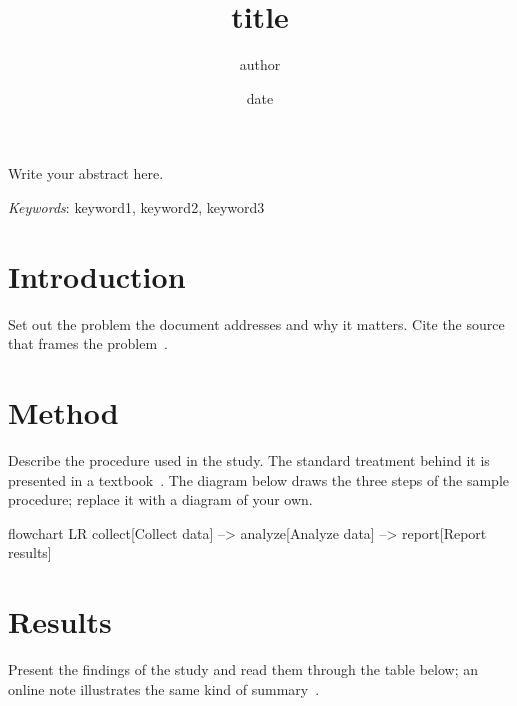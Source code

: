 \documentclass[a4paper,12pt]{report}
\title{{{title}}}
\author{{{author}}}
\date{{{date}}}
\newcommand{\lblKeywords}{Keywords}
\numberwithin{equation}{chapter}
\begin{document}
  \maketitle
  \thispagestyle{empty}\newpage

  \chapter*{\abstractname}
  Write your abstract here.

  \noindent\textit{\lblKeywords}: keyword1, keyword2, keyword3

  \chapter{Introduction}
  Set out the problem the document addresses and why it matters. Cite the
  source that frames the problem~\cite{example}.

  \chapter{Method}
  Describe the procedure used in the study. The standard treatment behind it
  is presented in a textbook~\cite{example2}. The diagram below draws the
  three steps of the sample procedure; replace it with a diagram of your own.

  \begin{mermaid}[style=monochrome, caption={General flow of the procedure}, pos=H]
    flowchart LR
    collect[Collect data] --> analyze[Analyze data] --> report[Report results]
  \end{mermaid}

  \chapter{Results}
  Present the findings of the study and read them through the table below; an
  online note illustrates the same kind of summary~\cite{example3}.
\end{document}
